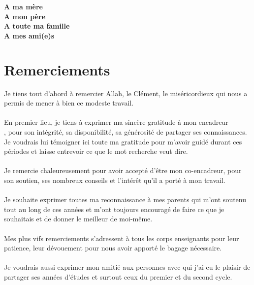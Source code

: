 \chapter*{}
\vspace{4mm}

\begin{flushright}
	\large
	\textbf{
		A ma mère \\
		A mon père \\
		A toute ma famille\\ A mes ami(e)s
	} 
\end{flushright}

\vspace{8mm}
\chapter*{Remerciements}
Je tiens tout d’abord à remercier Allah, le Clément, le miséricordieux qui nous a permis de mener à bien ce modeste travail.
\\\\
En premier lieu, je tiens à exprimer ma sincère gratitude à mon encadreur\\ \textbf{\saidouni{}}, pour son intégrité, sa disponibilité, sa générosité de partager ses connaissances. Je voudrais lui témoigner ici toute ma gratitude pour m'avoir guidé durant ces périodes et laisse entrevoir ce que le mot recherche veut dire.
\\\\
Je remercie chaleureusement \textbf{\bouneb{}} pour avoir accepté d'être mon co-encadreur, pour son soutien, ses nombreux conseils et l'intérêt qu'il a porté à mon travail.
\\\\
Je souhaite exprimer toutes ma reconnaissance à mes parents qui m'ont soutenu tout au long de ces années et m'ont toujours encouragé de faire ce que je souhaitais et de donner le meilleur de moi-même. 
\\\\
Mes plus vifs remerciements s’adressent à tous les corps enseignants pour leur patience, leur dévouement pour nous avoir apporté le bagage nécessaire.
\\\\
Je voudrais aussi exprimer mon amitié aux personnes avec qui j'ai eu le plaisir de partager ses années d'études et surtout ceux du premier et du second cycle.

